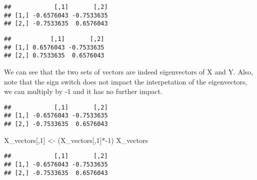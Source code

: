\documentclass[]{article}
\newenvironment{Shaded}{\begin{snugshade}}{\end{snugshade}}
\newcommand{\KeywordTok}[1]{\textcolor[rgb]{0.13,0.29,0.53}{\textbf{{#1}}}}
\newcommand{\DataTypeTok}[1]{\textcolor[rgb]{0.13,0.29,0.53}{{#1}}}
\newcommand{\DecValTok}[1]{\textcolor[rgb]{0.00,0.00,0.81}{{#1}}}
\newcommand{\StringTok}[1]{\textcolor[rgb]{0.31,0.60,0.02}{{#1}}}
\newcommand{\NormalTok}[1]{{#1}}
\begin{document}
\begin{Shaded}
\end{Shaded}

\begin{verbatim}
##            [,1]       [,2]
## [1,] -0.6576043 -0.7533635
## [2,] -0.7533635  0.6576043
\end{verbatim}

\begin{Shaded}
\end{Shaded}

\begin{verbatim}
##           [,1]       [,2]
## [1,] 0.6576043 -0.7533635
## [2,] 0.7533635  0.6576043
\end{verbatim}

We can see that the two sets of vectors are indeed eigenvectors of X and
Y. Also, note that the sign switch does not impact the interpetation of
the eigenvectors, we can multiply by -1 and it has no further impact.

\begin{Shaded}
\end{Shaded}

\begin{verbatim}
##            [,1]       [,2]
## [1,] -0.6576043 -0.7533635
## [2,] -0.7533635  0.6576043
\end{verbatim}

\begin{Shaded}
\begin{Highlighting}[]
\NormalTok{X_vectors[,}\DecValTok{1}\NormalTok{] <-}\StringTok{ }\NormalTok{(X_vectors[,}\DecValTok{1}\NormalTok{]*-}\DecValTok{1}\NormalTok{)}
\NormalTok{X_vectors}
\end{Highlighting}
\end{Shaded}

\begin{verbatim}
##            [,1]       [,2]
## [1,] -0.6576043 -0.7533635
## [2,] -0.7533635  0.6576043
\end{verbatim}
\end{document}
